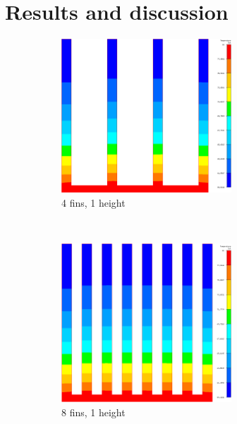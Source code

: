 \section{Results and discussion}
 
 \begin{figure}[h]
 \begin{subfigure}[t] {0.23\textwidth}
 \centering
 \includegraphics[width=0.7\textwidth]{../figures/heatsink4_h105_gmf005.png}
 \caption{4 fins, 1 height}
 \label{fig:mesh_temps_res_4_1}
 \end{subfigure}
 ~
  \begin{subfigure}[t] {0.23\textwidth}
 \centering
 \includegraphics[width=0.7\textwidth]{../figures/heatsink8_h105_gmf005.png}
 \caption{8 fins, 1 height}
 \label{fig:mesh_temps_res_8_1}
 \end{subfigure}
 ~
 \begin{subfigure}[t] {0.23\textwidth}

\end{subfigure}
\end{figure}
